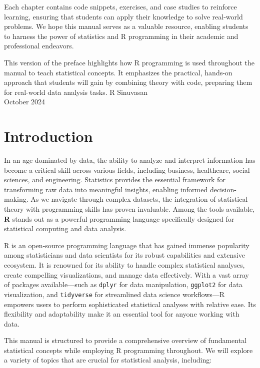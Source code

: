 \documentclass[10pt]{book}
\begin{document}
Each chapter contains code snippets, exercises, and case studies to reinforce learning, ensuring that students can apply their knowledge to solve real-world problems. We hope this manual serves as a valuable resource, enabling students to harness the power of statistics and R programming in their academic and professional endeavors.

This version of the preface highlights how R programming is used throughout the manual to teach statistical concepts. It emphasizes the practical, hands-on approach that students will gain by combining theory with code, preparing them for real-world data analysis tasks.
\vspace{0.5in}
R Sinuvasan \\
October 2024

\newpage

\tableofcontents
\newpage

\chapter{Introduction}

In an age dominated by data, the ability to analyze and interpret information has become a critical skill across various fields, including business, healthcare, social sciences, and engineering. Statistics provides the essential framework for transforming raw data into meaningful insights, enabling informed decision-making. As we navigate through complex datasets, the integration of statistical theory with programming skills has proven invaluable. Among the tools available, \textbf{R} stands out as a powerful programming language specifically designed for statistical computing and data analysis.

R is an open-source programming language that has gained immense popularity among statisticians and data scientists for its robust capabilities and extensive ecosystem. It is renowned for its ability to handle complex statistical analyses, create compelling visualizations, and manage data effectively. With a vast array of packages available—such as \texttt{dplyr} for data manipulation, \texttt{ggplot2} for data visualization, and \texttt{tidyverse} for streamlined data science workflows—R empowers users to perform sophisticated statistical analyses with relative ease. Its flexibility and adaptability make it an essential tool for anyone working with data.

This manual is structured to provide a comprehensive overview of fundamental statistical concepts while employing R programming throughout. We will explore a variety of topics that are crucial for statistical analysis, including:
\end{document}
